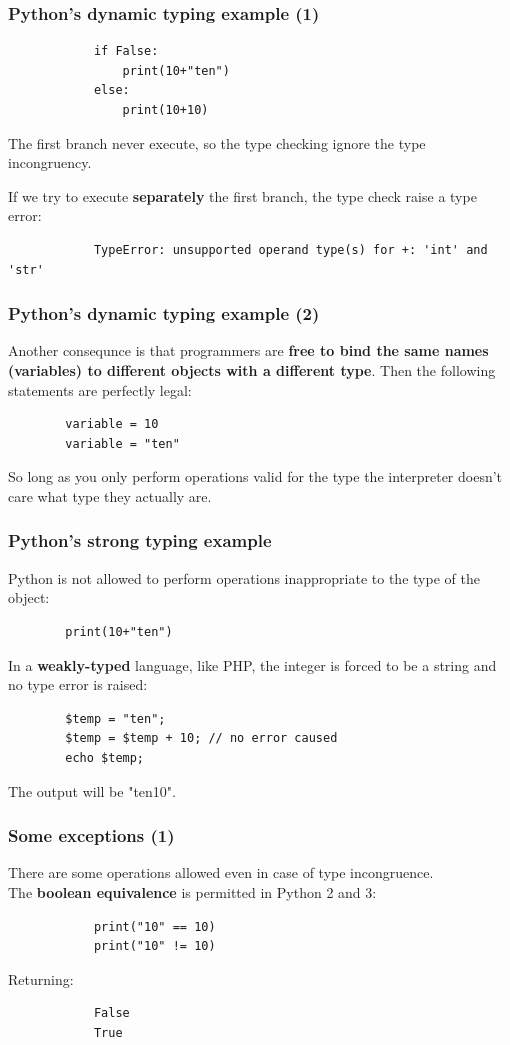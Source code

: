 \documentclass[xcolor ={table,usenames,dvipsnames}]{beamer}
\theoremstyle{definition}
\begin{document}
	\begin{frame}[fragile]
		\frametitle{Python's dynamic typing example (1)}
			\begin{lstlisting} 
			if False:
				print(10+"ten") 
			else:
				print(10+10)
			\end{lstlisting}
			The first branch never execute, so the type checking ignore the type incongruency.
			
			If we try to execute \textbf{separately} the first branch, the type check raise a type error:
			
			\begin{lstlisting}
			TypeError: unsupported operand type(s) for +: 'int' and 'str'
			\end{lstlisting}
	\end{frame}

	\begin{frame}[fragile]
		\frametitle{Python's dynamic typing example (2)}
		Another consequnce is that programmers are \textbf{free to bind the same names (variables) to different objects with a different type}. Then the following statements are perfectly legal:
		
		\begin{lstlisting}
		variable = 10
		variable = "ten"
		\end{lstlisting}
		
		So long as you only perform operations valid for the type the interpreter doesn't care what type they actually are. 
	\end{frame}

	\begin{frame}[fragile]
		\frametitle{Python's strong typing example}
		Python is not allowed to perform operations inappropriate to the type of the object: 
		\begin{lstlisting}
		print(10+"ten")
		\end{lstlisting}
		
		In a \textbf{weakly-typed} language, like PHP, the integer is forced to be a string and no type error is raised:
		\begin{lstlisting}
		$temp = "ten"; 
		$temp = $temp + 10; // no error caused
		echo $temp;
		\end{lstlisting}
	The output will be "ten10".
	\end{frame}

	\begin{frame}[fragile]
		\frametitle{Some exceptions (1)}
		There are some operations allowed even in case of type incongruence.\\
		The\textbf{ boolean equivalence} is permitted in Python 2 and 3: 
		
		\begin{lstlisting}
			print("10" == 10)
			print("10" != 10)
		\end{lstlisting}
		Returning:
		\begin{lstlisting}
			False
			True
		\end{lstlisting}
	\end{frame}
\end{document}
